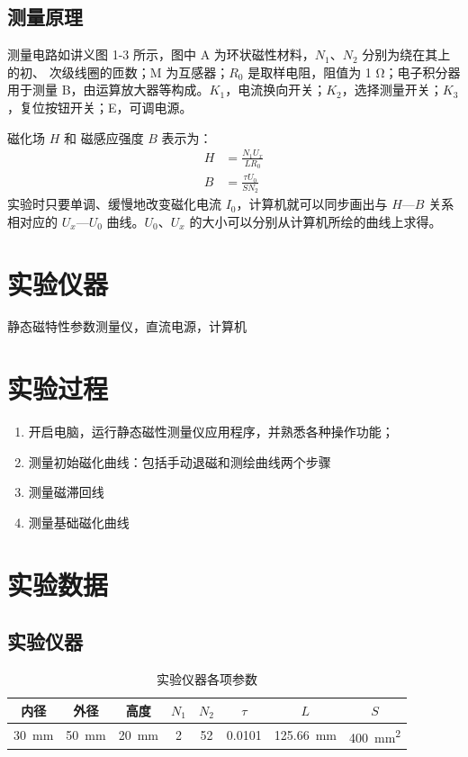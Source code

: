     \subsection{测量原理}
        测量电路如讲义图 1-3 所示，图中 A 为环状磁性材料，$N_1$、$N_2$ 分别为绕在其上的初、 次级线圈的匝数；M 为互感器；$R_0$ 是取样电阻，阻值为 1 \unit{\ohm}；电子积分器用于测量 B，由运算放大器等构成。$K_1$，电流换向开关；$K_2$，选择测量开关；$K_3$，复位按钮开关；E，可调电源。\par
        磁化场 $H$ 和 磁感应强度 $B$ 表示为：
        \begin{align}
            H&=\frac{N_1 U_x}{L R_0}\label{equ:A8.1}\\
            B&=\frac{\tau U_0}{S N_2}\label{equ:A8.2}
        \end{align}
        实验时只要单调、缓慢地改变磁化电流 $I_0$，计算机就可以同步画出与 $H—B$ 关系相对应的 $U_x—U_0$ 曲线。$U_0$、$U_x$ 的大小可以分别从计算机所绘的曲线上求得。
\section{实验仪器}%
    静态磁特性参数测量仪，直流电源，计算机
\section{实验过程}%
    \begin{enumerate}
        \item 开启电脑，运行静态磁性测量仪应用程序，并熟悉各种操作功能；
        \item 测量初始磁化曲线：包括手动退磁和测绘曲线两个步骤
        \item 测量磁滞回线
        \item 测量基础磁化曲线
    \end{enumerate}

\section{实验数据}
\subsection{实验仪器}
\begin{table}[!ht]
    \caption{实验仪器各项参数}
    \begin{tabular}{*{8}{c}} \toprule
        内径 & 外径 & 高度 & $N_1$ & $N_2$ & $\tau$ & $L$ & $S$ \\ \midrule
        \SI{30}{\mm} & \SI{50}{\mm} & \SI{20}{\mm} & 2 & 52 & 0.0101 & \SI{125.66}{\mm} & \SI{400}{\square\mm} \\ \bottomrule
    \end{tabular}
\end{table}
